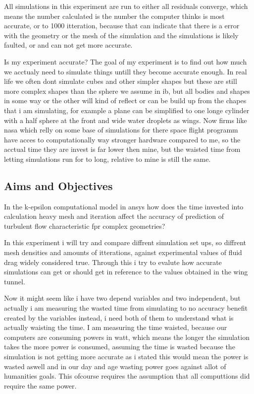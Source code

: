 \documentclass[12pt,a4paper]{article}
\begin{document}
All simulations in this experiment are run to either all residuals converge, which means the number calculated is the number the computer thinks is most accurate, or to 1000 itteration, because that can indicate that there is a error with the geometry or the mesh of the simulation and the simulations is likely faulted, or and can not get more accurate.

Is my experiment accurate?
The goal of my experiment is to find out how much we acctualy need to simulate things untill they become accurate enough. In real life we often dont simulate cubes and other simpler shapes but these are still more complex shapes than the sphere we assume in ib, but all bodies and shapes in some way or the other will kind of reflect or can be build up from the chapes that i am simulating, for example a plane can be simplified to one longe cylinder with a half sphere at the front and wide water droplets as wings. Now firms like nasa which relly on some base of simulations for there space flight programm have acces to computationally way stronger hardware compared to me, so the acctual time they are invest is far lower then mine, but the waisted time from letting simulations run for to long, relative to mine is still the same.

\subsection{Aims and Objectives}

In the k-epsilon computational model in ansys how does the time invested into calculation heavy mesh and iteration affect the accuracy of prediction of turbulent flow characteristic fpr complex geometries?

In this experiment i will try and compare diffrent simulation set ups, so diffrent mesh densities and amounts of itterations, against experimental values of fluid drag widely considered true. Through this i try to evalute how accurate simulations can get or should get in reference to the values obtained in the wing tunnel.

Now it might seem like i have two depend variables and two independent, but actually i am measuring the wasted time from simulating to no accuracy benefit created by the variables instead, i need both of them to understand what is actually waisting the time. I am measuring the time waisted, because our computers are consuming powers in watt, which means the longer the simulation takes the more power is consumed, assuming the time is wasted because the simulation is not getting more accurate as i stated this would mean the power is wasted aswell and in our day and age wasting power goes against allot of humanities goals. This ofcourse requires the assumption that all computtions did require the same power.
\end{document}
